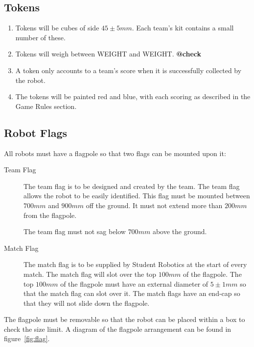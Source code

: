 \subsection{Tokens}
\label{tokens}
\begin {enumerate} 
\item Tokens will be cubes of side $45\pm5mm$.
 Each team's kit contains a small number of these.
\item Tokens will weigh between WEIGHT and WEIGHT.	\textbf{@check}
\item A token only accounts to a team's score when it is successfully collected by the robot.
\item The tokens will be painted red and blue, with each scoring as described in the Game Rules section.
\end {enumerate}

\subsection{Robot Flags}
\label{sec:flags}
All robots must have a flagpole so that two flags can be mounted upon it:
\begin{description}
\item[Team Flag] The team flag is to be designed and created by the team.
 The team flag allows the robot to be easily identified.
 This flag must be mounted between $700mm$ and $900mm$ off the ground.
 It must not extend more than $200mm$ from the flagpole.

The team flag must not sag below $700mm$ above the ground.
\item[Match Flag] The match flag is to be supplied by Student Robotics at the start of every match.
 The match flag will slot over the top $100mm$ of the flagpole.
 The top $100mm$ of the flagpole must have an external diameter of $5\pm1mm$ so that the match flag can slot over it.
 The match flags have an end-cap so that they will not slide down the flagpole.
\end{description}

The flagpole must be removable so that the robot can be placed within a box to check the size limit.
A diagram of the flagpole arrangement can be found in figure~\ref{fig:flag}.

